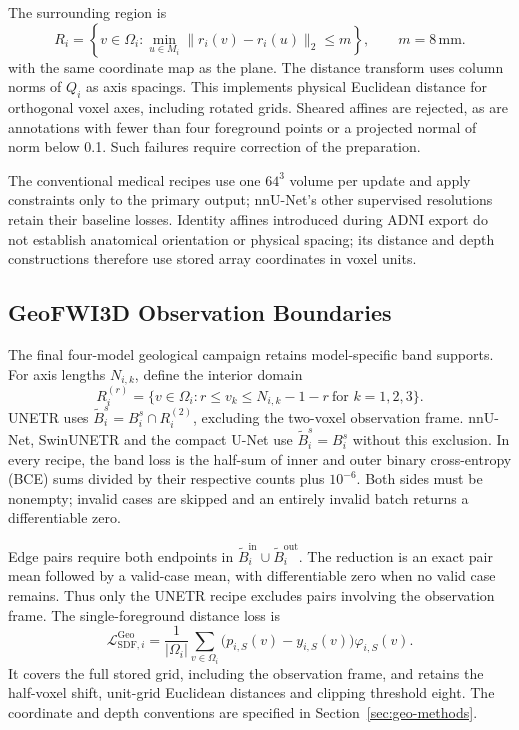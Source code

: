 \documentclass[12pt,a4paper]{article}
\begin{document}
The surrounding region is
\begin{equation}
R_i=\left\{v\in\Omega_i:
       \min_{u\in M_i}\|r_i(v)-r_i(u)\|_2\leq m\right\},
\qquad m=8\,\mathrm{mm}.
\label{eq:depth-region-of-interest}
\end{equation}
with the same coordinate map as the plane. The distance transform uses
column norms of $Q_i$ as axis spacings. This implements physical
Euclidean distance for orthogonal voxel axes, including rotated grids.
Sheared affines are rejected, as are annotations with fewer than four
foreground points or a projected normal of norm below 0.1. Such
failures require correction of the preparation.

The conventional medical recipes use one $64^3$ volume per update
and apply constraints only to the primary output; nnU-Net's other
supervised resolutions retain their baseline losses. Identity affines
introduced during ADNI export do not establish anatomical orientation
or physical spacing; its distance and depth constructions therefore
use stored array coordinates in voxel units.

\subsection{GeoFWI3D Observation Boundaries}
\label{sec:geo-boundaries}

The final four-model geological campaign retains model-specific band
supports. For axis lengths $N_{i,k}$, define the interior domain
\begin{equation}
R_i^{(r)}=\{v\in\Omega_i:
 r\leq v_k\leq N_{i,k}-1-r\ \text{for }k=1,2,3\}.
\label{eq:geological-band-frame}
\end{equation}
UNETR uses $\widetilde B_i^s=B_i^s\cap R_i^{(2)}$, excluding the
two-voxel observation frame. nnU-Net, SwinUNETR and the compact U-Net
use $\widetilde B_i^s=B_i^s$ without this exclusion. In every recipe,
the band loss is the half-sum of inner and outer binary cross-entropy (BCE) sums divided
by their respective counts plus $10^{-6}$. Both sides must be
nonempty; invalid cases are skipped and an entirely invalid batch
returns a differentiable zero.

Edge pairs require both endpoints in
$\widetilde B_i^{\mathrm{in}}\cup\widetilde B_i^{\mathrm{out}}$.
The reduction is an exact pair mean followed by a valid-case mean,
with differentiable zero when no valid case remains. Thus only the
UNETR recipe excludes pairs involving the observation frame.
The single-foreground distance loss is
\begin{equation}
\mathcal{L}_{\mathrm{SDF},i}^{\mathrm{Geo}}
=\frac{1}{|\Omega_i|}\sum_{v\in\Omega_i}
 \bigl(p_{i,S}(v)-y_{i,S}(v)\bigr)\varphi_{i,S}(v).
\label{eq:geological-sdf-loss}
\end{equation}
It covers the full stored grid, including the observation frame,
and retains the half-voxel shift, unit-grid Euclidean distances and
clipping threshold eight. The coordinate and depth conventions are
specified in Section~\ref{sec:geo-methods}.
\end{document}
